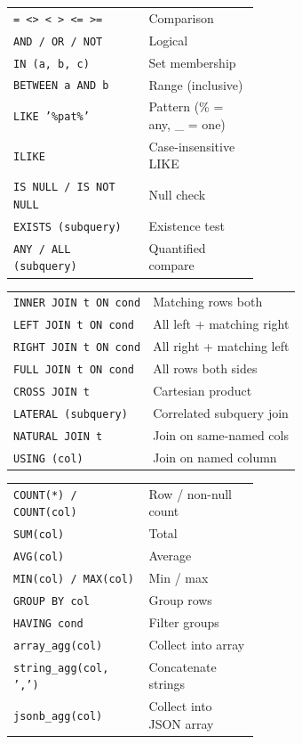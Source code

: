 \documentclass[10pt]{extarticle}
\begin{document}
\begin{multicols}{2}
\begin{tabularx}{\linewidth}{@{}>{\raggedright\arraybackslash}p{0.55\linewidth}@{\enspace}Y@{}}
\texttt{= <> < > <= >=}             & Comparison \\
\texttt{AND / OR / NOT}             & Logical \\
\texttt{IN (a, b, c)}               & Set membership \\
\texttt{BETWEEN a AND b}            & Range (inclusive) \\
\texttt{LIKE '\%pat\%'}             & Pattern (\% = any, \_ = one) \\
\texttt{ILIKE}                       & Case-insensitive LIKE \\
\texttt{IS NULL / IS NOT NULL}      & Null check \\
\texttt{EXISTS (subquery)}          & Existence test \\
\texttt{ANY / ALL (subquery)}       & Quantified compare \\
\end{tabularx}

\begin{tabularx}{\linewidth}{@{}l@{\enspace}Y@{}}
\texttt{INNER JOIN t ON cond}       & Matching rows both \\
\texttt{LEFT JOIN t ON cond}        & All left + matching right \\
\texttt{RIGHT JOIN t ON cond}       & All right + matching left \\
\texttt{FULL JOIN t ON cond}        & All rows both sides \\
\texttt{CROSS JOIN t}               & Cartesian product \\
\texttt{LATERAL (subquery)}         & Correlated subquery join \\
\texttt{NATURAL JOIN t}             & Join on same-named cols \\
\texttt{USING (col)}                & Join on named column \\
\end{tabularx}

\begin{tabularx}{\linewidth}{@{}>{\raggedright\arraybackslash}p{0.55\linewidth}@{\enspace}Y@{}}
\texttt{COUNT(*) / COUNT(col)}      & Row / non-null count \\
\texttt{SUM(col)}                    & Total \\
\texttt{AVG(col)}                    & Average \\
\texttt{MIN(col) / MAX(col)}        & Min / max \\
\texttt{GROUP BY col}               & Group rows \\
\texttt{HAVING cond}                & Filter groups \\
\texttt{array\_agg(col)}            & Collect into array \\
\texttt{string\_agg(col, ',')}      & Concatenate strings \\
\texttt{jsonb\_agg(col)}            & Collect into JSON array \\
\end{tabularx}


\end{multicols}
\end{document}

